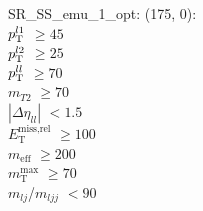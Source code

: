 SR\_SS\_emu\_1\_opt: (175, 0): \\
$p_{\text{T}}^{l1}$ $\geq 45$ \\
$p_{\text{T}}^{l2}$ $\geq 25$ \\
$p_{\text{T}}^{ll}$ $\geq 70$ \\
$m_{T2}$ $\geq 70$ \\
$|\Delta\eta_{ll}|$ $<1.5$ \\
$E_{\text{T}}^{\text{miss,rel}}$ $\geq 100$ \\
$m_{\text{eff}}$ $\geq 200$ \\
$m_{\text{T}}^{\text{max}}$ $\geq 70$ \\
$m_{lj}$/$m_{ljj}$ $<90$ \\
